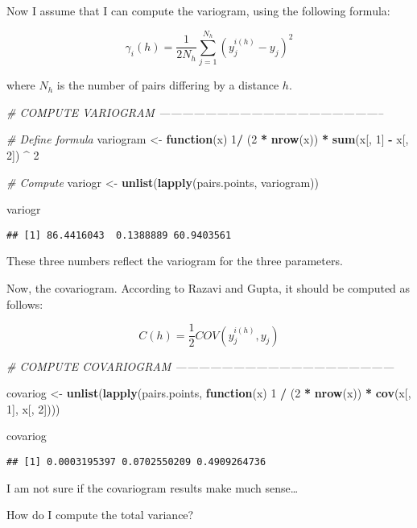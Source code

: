 \documentclass[11pt,]{article}
\newenvironment{Shaded}{\begin{snugshade}}{\end{snugshade}}
\newcommand{\CommentTok}[1]{\textcolor[rgb]{0.56,0.35,0.01}{\textit{#1}}}
\newcommand{\ControlFlowTok}[1]{\textcolor[rgb]{0.13,0.29,0.53}{\textbf{#1}}}
\newcommand{\DecValTok}[1]{\textcolor[rgb]{0.00,0.00,0.81}{#1}}
\newcommand{\KeywordTok}[1]{\textcolor[rgb]{0.13,0.29,0.53}{\textbf{#1}}}
\newcommand{\NormalTok}[1]{#1}
\newcommand{\OperatorTok}[1]{\textcolor[rgb]{0.81,0.36,0.00}{\textbf{#1}}}
\newcommand{\StringTok}[1]{\textcolor[rgb]{0.31,0.60,0.02}{#1}}
\begin{document}
Now I assume that I can compute the variogram, using the following
formula:

\begin{equation}
\gamma_i(h) = \frac{1}{2N_h} \sum_{j=1}^{N_h}(y_j^{i(h)} - y_j)^2
\end{equation}

where \(N_h\) is the number of pairs differing by a distance \(h\).

\begin{Shaded}
\begin{Highlighting}[]
\CommentTok{# COMPUTE VARIOGRAM -----------------------------------------------------------}

\CommentTok{# Define formula}
\NormalTok{variogram <-}\StringTok{ }\ControlFlowTok{function}\NormalTok{(x) }\DecValTok{1}\OperatorTok{/}\StringTok{ }\NormalTok{(}\DecValTok{2} \OperatorTok{*}\StringTok{ }\KeywordTok{nrow}\NormalTok{(x)) }\OperatorTok{*}\StringTok{ }\KeywordTok{sum}\NormalTok{(x[, }\DecValTok{1}\NormalTok{] }\OperatorTok{-}\StringTok{ }\NormalTok{x[, }\DecValTok{2}\NormalTok{]) }\OperatorTok{^}\StringTok{ }\DecValTok{2}

\CommentTok{# Compute}
\NormalTok{variogr <-}\StringTok{ }\KeywordTok{unlist}\NormalTok{(}\KeywordTok{lapply}\NormalTok{(pairs.points, variogram))}

\NormalTok{variogr}
\end{Highlighting}
\end{Shaded}

\begin{verbatim}
## [1] 86.4416043  0.1388889 60.9403561
\end{verbatim}

These three numbers reflect the variogram for the three parameters.

Now, the covariogram. According to Razavi and Gupta, it should be
computed as follows:

\begin{equation}
C(h) = \frac{1}{2} COV(y_j^{i(h)}, y_j)
\end{equation}

\begin{Shaded}
\begin{Highlighting}[]
\CommentTok{# COMPUTE COVARIOGRAM ---------------------------------------------------------}

\NormalTok{covariog <-}\StringTok{ }\KeywordTok{unlist}\NormalTok{(}\KeywordTok{lapply}\NormalTok{(pairs.points, }\ControlFlowTok{function}\NormalTok{(x) }\DecValTok{1} \OperatorTok{/}\StringTok{ }\NormalTok{(}\DecValTok{2} \OperatorTok{*}\StringTok{ }\KeywordTok{nrow}\NormalTok{(x)) }\OperatorTok{*}\StringTok{ }\KeywordTok{cov}\NormalTok{(x[, }\DecValTok{1}\NormalTok{], x[, }\DecValTok{2}\NormalTok{])))}

\NormalTok{covariog}
\end{Highlighting}
\end{Shaded}

\begin{verbatim}
## [1] 0.0003195397 0.0702550209 0.4909264736
\end{verbatim}

I am not sure if the covariogram results make much sense\ldots{}

How do I compute the total variance?
\end{document}
